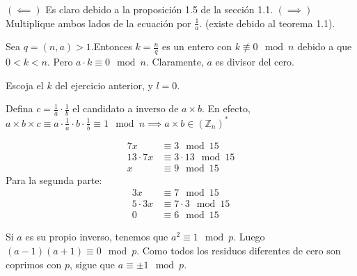 \begin{sol}
	$(\impliedby)$ Es claro debido a la proposici\'on 1.5 de la secci\'on 1.1.
	$(\implies)$ Multiplique ambos lados de la ecuaci\'on por $\frac{1}{a}$. (existe debido al teorema 1.1).
\end{sol}

\begin{sol}
	Sea $q = (n,a)>1$.Entonces $k= \frac{n}{q}$ es un entero con $k\not\equiv 0 \mod n$ debido a que $0<k<n$. Pero $a\cdot k \equiv 0 \mod n$. Claramente, $a$ es divisor del cero. 
\end{sol}

\begin{sol}
	Escoja el $k$ del ejercicio anterior, y $l=0$.
\end{sol}

\begin{sol}
	Defina $c = \frac{1}{a}\cdot \frac{1}{b}$ el candidato a inverso de $a\times b$. En efecto, $a\times b \times c \equiv a \cdot \frac{1}{a} \cdot b \cdot \frac{1}{b} \equiv 1 \mod n \implies a\times b \in (\mathbb{Z}_{n})^{*}$
\end{sol}

\begin{sol}
	\begin{align}
	7x &\equiv 3 \mod 15 \\
	13\cdot 7x &\equiv 3\cdot 13 \mod 15 \\
	x &\equiv 9 \mod 15
	\end{align}
	Para la segunda parte:
	\begin{align}
	3x &\equiv 7 \mod 15 \\
	5\cdot 3x &\equiv 7\cdot 3 \mod 15 \\
	0 &\equiv 6 \mod 15
	\end{align}
\end{sol}

\begin{sol}
	Si $a$ es su propio inverso, tenemos que $a^2 \equiv 1 \mod p$. Luego $(a-1)(a+1) \equiv 0 \mod p$. Como todos los residuos diferentes de cero son coprimos con $p$, sigue que $a \equiv \pm 1 \mod p$.
\end{sol}

